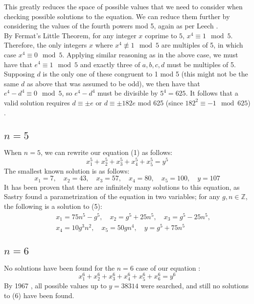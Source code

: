 \documentclass{article}
\newcommand{\q}{\quad}
\begin{document}
\begin{flushleft}
\vspace{.1in}
This greatly reduces the space of possible values that we need to consider when checking possible solutions to the equation. We can reduce them further by considering the values of the fourth powers mod 5, again as per Leech \cite{leech}.  \\
\vspace{.1in}
By Fermat's Little Theorem, for any integer $x$ coprime to $5$, $x^4 \equiv 1 \mod 5$. Therefore, the only integers $x$ where $x^4 \not\equiv 1 \mod 5$ are multiples of 5, in which case $x^4 \equiv 0 \mod 5$. Applying similar reasoning as in the above case, we must have that $e^4 \equiv 1 \mod 5$ and exactly three of $a, b, c, d$ must be multiples of 5. Supposing $d$ is the only one of these congruent to 1 mod 5 (this might not be the same $d$ as above that was assumed to be odd), we then have that $e^4-d^4 \equiv 0 \mod 5 $, so $e^4-d^4$ must be divisible by $5^4=625$. It follows that a valid solution requires $d \equiv \pm e$ or $d \equiv \pm 182 e $ mod 625 (since $182^2\equiv -1 \mod 625$) \cite{leech}. 


\subsection{$n=5$}
When $n=5$, we can rewrite our equation (1) as follows:
\begin{equation}
    x_1^5 + x_2^5 + x_3^5 +x_4^5 + x_5^5 = y^5
\end{equation}
The smallest known solution \cite{sastry} is as follows:
\begin{equation*}
    x_1=7, \quad x_2=43, \quad x_3= 57, \quad x_4= 80, \quad x_5=100, \quad y=107
\end{equation*}
It has been proven that there are infinitely many solutions to this equation, as Sastry \cite{sastry} found a parametrization of the equation in two variables; for any $g, n \in \mathbb{Z}$, the following is a solution to (5):
\begin{align*}
    &x_1=75n^5-g^5, \q x_2 = g^5 + 25n^5, \q x_3 = g^5 - 25n^5, \\ 
    \q &x_4 = 10g^3n^2, \q x_5 = 50gn^4, \q y=g^5+75n^5 
\end{align*}

\subsection{$n=6$}
No solutions have been found for the $n=6$ case of our equation \cite{lander} \cite{diopheqsixth}:
\begin{equation}
    x_1^6 + x_2^6 + x_3^6 +x_4^6 + x_5^6 + x_6^6 = y^6
\end{equation}
By 1967 \cite{lander}, all possible values up to $y=38314$ were searched, and still no solutions to (6) have been found. \\
\vspace{.1in}


\end{flushleft}
\end{document}
